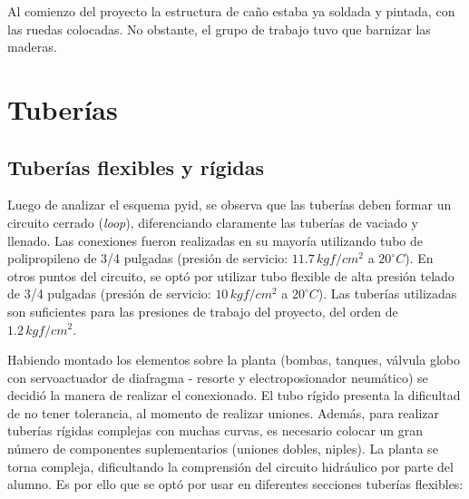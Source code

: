 Al comienzo del proyecto la estructura de caño estaba ya soldada y pintada, con
las ruedas colocadas.
No obstante, el grupo de trabajo tuvo que barnizar las maderas.

\section{Tuberías}
\label{sec:Canerias}

\subsection{Tuberías flexibles y rígidas}
Luego de analizar el esquema \gls{pyid}, se observa que las tuberías deben
formar un circuito cerrado (\emph{loop}), diferenciando
claramente las tuberías de vaciado y llenado.
Las conexiones fueron realizadas en su mayoría utilizando tubo de polipropileno
de 3/4
pulgadas (presión de servicio: $11.7\,kgf/cm^2$ a $20^\circ C$).
En otros puntos del circuito, se optó por utilizar tubo flexible de alta presión
telado de 3/4 pulgadas (presión de servicio: $10\,kgf/cm^2$ a $20^\circ C$).
Las tuberías utilizadas son suficientes para las presiones de trabajo del
proyecto, del orden de $1.2\,kgf/cm^2$.

Habiendo montado los elementos sobre la planta (bombas, tanques, válvula globo
con servoactuador de diafragma - resorte y electroposionador neumático) se
decidió la manera de realizar el conexionado.
El tubo rígido presenta la dificultad de no tener tolerancia, al momento de
realizar uniones.
Además, para realizar tuberías rígidas complejas con muchas curvas, es necesario
colocar un gran número de componentes suplementarios (uniones dobles,
niples).
La planta se torna compleja, dificultando la comprensión del circuito
hidráulico por parte del alumno.
Es por ello que se optó por usar en diferentes secciones tuberías flexibles:

